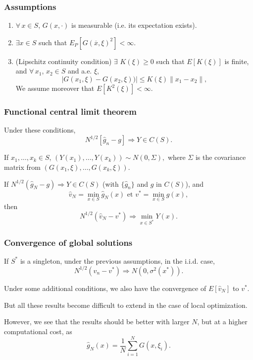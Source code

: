 \documentclass{beamer}
\begin{document}
\begin{frame}
\frametitle{Assumptions}

\begin{enumerate}
\item
$\forall\, x \in S$, $G(x,\cdot)$ is measurable (i.e. its expectation exists).
\item
$\exists {x} \in S$ such that $E_P[G(\overline{x}, \xi)^2] < \infty$.
\item
(Lipschitz continuity condition) 
$\exists$ $K(\xi) \geq 0$ such that $E[K(\xi)]$ is finite, and
$\forall\, x_1$, $x_2 \in S$ and a.e. $\xi$,
\[
| G(x_1, \xi) - G(x_2, \xi) )| \leq K(\xi) \| x_1 - x_2\|,
\]
We assume moreover that $E[K^2(\xi)] < \infty$.%
\end{enumerate}

\end{frame}

\begin{frame}
\frametitle{Functional central limit theorem}

Under these conditions,
\[
N^{1/2} [\hat{g}_n - g] \Rightarrow Y \in C(S).
\]

\mbox{}

If $x_1,\ldots,x_k \in S$, %
$
(Y(x_1),\ldots,Y(x_k)) \sim N(0, \Sigma),
$
where $\Sigma$ is the covariance matrix from $(G(x_1, \xi), \ldots, G(x_k, \xi))$.

\mbox{}

If $N^{1/2}(\hat{g}_N - g) \Rightarrow Y \in C(S)$ (with $\lbrace \hat{g}_n \rbrace$ and $g$ in $C(S)$), and
\[
\hat{v}_N = \min_{x \in S} \hat{g}_N(x) \mbox{ et } v^*= \min_{x \in S} g(x),
\]
then
\[
N^{1/2}(\hat{v}_N - v^*) \Rightarrow \min_{x \in S^*} Y(x).
\]

\end{frame}

\begin{frame}
\frametitle{Convergence of global solutions}

If $S^*$ is a singleton, under the previous assumptions, in the i.i.d. case,
\[
N^{1/2}(\hat{v}_n - v^*) \Rightarrow N(0, \sigma^2(x^*) ).
\]

\mbox{}

Under some additional conditions, we also have the convergence of $E[\hat{v}_N]$ to $v^*$.

\mbox{}

But all these results become difficult to extend in the case of local optimization.

\mbox{}

However, we see that the results should be better with larger $N$, but at a higher computational cost, as
$$
\hat{g}_N(x) = \frac{1}{N} \sum_{i = 1}^N G (x, \xi_i).
$$

\end{frame}
\end{document}
